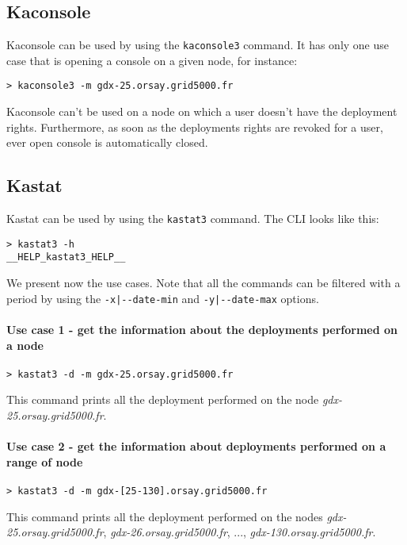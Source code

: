 \documentclass[a4wide,10pt,oneside]{book}
\begin{document}
\subsection{Kaconsole}\label{sec:kaconsole}
Kaconsole can be used by using the \texttt{kaconsole3} command. It has only one use case that is opening a console on a given node, for instance:
\begin{verbatim}
> kaconsole3 -m gdx-25.orsay.grid5000.fr
\end{verbatim}

Kaconsole can't be used on a node on which a user doesn't have the deployment rights. Furthermore, as soon as the deployments rights are revoked for a user, ever open console is automatically closed.

\subsection{Kastat}\label{sec:kastat}
Kastat can be used by using the \texttt{kastat3} command. The CLI looks like this:
\begin{small}
\begin{verbatim}
> kastat3 -h
__HELP_kastat3_HELP__
\end{verbatim}
\end{small}

We present now the use cases. Note that all the commands can be filtered with a period by using the \texttt{-x|-{}-date-min} and \texttt{-y|-{}-date-max} options.
\paragraph{Use case 1 - get the information about the deployments performed on a node}
\begin{verbatim}
> kastat3 -d -m gdx-25.orsay.grid5000.fr
\end{verbatim}
This command prints all the deployment performed on the node \textit{gdx-25.orsay.grid5000.fr}.

\paragraph{Use case 2 - get the information about deployments performed on a range of node}
\begin{verbatim}
> kastat3 -d -m gdx-[25-130].orsay.grid5000.fr
\end{verbatim}
This command prints all the deployment performed on the nodes \textit{gdx-25.orsay.grid5000.fr}, \textit{gdx-26.orsay.grid5000.fr}, ..., \textit{gdx-130.orsay.grid5000.fr}.
\end{document}
